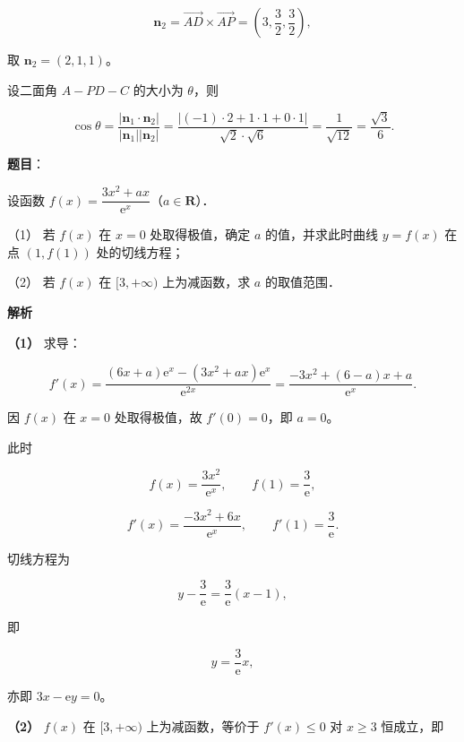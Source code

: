 \begin{answer}
\nopagebreak[4]
\[
\boldsymbol{n}_{2}=\overrightarrow{AD}\times\overrightarrow{AP}
=\left(3,\frac{3}{2},\frac{3}{2}\right),
\]

取 $\boldsymbol{n}_{2}=(2,1,1)$。

设二面角 $A-PD-C$ 的大小为 $\theta$，则

\nopagebreak[4]
\[
\cos\theta=\frac{|\boldsymbol{n}_{1}\cdot\boldsymbol{n}_{2}|}{|\boldsymbol{n}_{1}||\boldsymbol{n}_{2}|}
=\frac{|(-1)\cdot 2+1\cdot 1+0\cdot 1|}{\sqrt{2}\cdot\sqrt{6}}
=\frac{1}{\sqrt{12}}=\frac{\sqrt{3}}{6}.
\]



\end{answer}
\begin{answer}

\textbf{题目}：

设函数 $f(x)=\dfrac{3x^{2}+ax}{\mathrm{e}^{x}}$（$a\in\mathbf{R}$）．

（1） 若 $f(x)$ 在 $x=0$ 处取得极值，确定 $a$ 的值，并求此时曲线 $y=f(x)$ 在点 $(1,f(1))$ 处的切线方程；

（2） 若 $f(x)$ 在 $[3,+\infty)$ 上为减函数，求 $a$ 的取值范围．

\textbf{解析}

\textbf{（1）} 求导：

\nopagebreak[4]
\[
f'(x)=\frac{(6x+a)\mathrm{e}^{x}-(3x^{2}+ax)\mathrm{e}^{x}}{\mathrm{e}^{2x}}
=\frac{-3x^{2}+(6-a)x+a}{\mathrm{e}^{x}}.
\]

因 $f(x)$ 在 $x=0$ 处取得极值，故 $f'(0)=0$，即 $a=0$。

此时

\nopagebreak[4]
\[
f(x)=\frac{3x^{2}}{\mathrm{e}^{x}},\qquad f(1)=\frac{3}{\mathrm{e}},
\]

\nopagebreak[4]
\[
f'(x)=\frac{-3x^{2}+6x}{\mathrm{e}^{x}},\qquad f'(1)=\frac{3}{\mathrm{e}}.
\]

切线方程为

\nopagebreak[4]
\[
y-\frac{3}{\mathrm{e}}=\frac{3}{\mathrm{e}}(x-1),
\]

即

\nopagebreak[4]
\[
y=\frac{3}{\mathrm{e}}x,
\]

亦即 $3x-\mathrm{e}y=0$。

\textbf{（2）} $f(x)$ 在 $[3,+\infty)$ 上为减函数，等价于 $f'(x)\le 0$ 对 $x\ge 3$ 恒成立，即


\end{answer}
